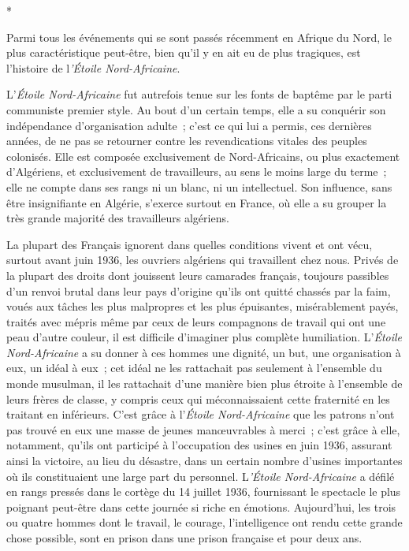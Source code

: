 \documentclass[french,twoside]{book} %
\begin{document}
\begin{center}
*\end{center}
\noindent Parmi tous les événements qui se sont passés récemment en Afrique du Nord, le plus caractéristique peut-être, bien qu'il y en ait eu de plus tragiques, est l'histoire de l{\itshape 'Étoile Nord-Africaine}.\par
L'{\itshape Étoile Nord-Africaine} fut autrefois tenue sur les fonts de baptême par le parti communiste premier style. Au bout d'un certain temps, elle a su conquérir son indépendance d'organisation adulte ; c'est ce qui lui a permis, ces dernières années, de ne pas se retourner contre les revendications vitales des peuples colonisés. Elle est composée exclusivement de Nord-Africains, ou plus exactement d'Algériens, et exclusivement de travailleurs, au sens le moins large du terme ; elle ne compte dans ses rangs ni un blanc, ni un intellectuel. Son influence, sans être insignifiante en Algérie, s'exerce surtout en France, où elle a su grouper la très grande majorité des travailleurs algériens.\par
La plupart des Français ignorent dans quelles conditions vivent et ont vécu, surtout avant juin 1936, les ouvriers algériens qui travaillent chez nous. Privés de la plupart des droits dont jouissent leurs camarades français, tou­jours passibles d'un renvoi brutal dans leur pays d'origine qu'ils ont quitté chassés par la faim, voués aux tâches les plus malpropres et les plus épuisantes, misérablement payés, traités avec mépris même par ceux de leurs compagnons de travail qui ont une peau d'autre couleur, il est difficile d'imaginer plus complète humiliation. L'{\itshape Étoile Nord-Africaine} a su donner à ces hommes une dignité, un but, une organisation à eux, un idéal à eux ; cet idéal ne les rattachait pas seulement à l'ensemble du monde musulman, il les rattachait d'une manière bien plus étroite à l'ensemble de leurs frères de classe, y compris ceux qui méconnaissaient cette fraternité en les traitant en inférieurs. C'est grâce à l'{\itshape Étoile Nord-Africaine} que les patrons n'ont pas trouvé en eux une masse de jeunes manœuvrables à merci ; c'est grâce à elle, notamment, qu'ils ont participé à l'occupation des usines en juin 1936, assurant ainsi la victoire, au lieu du désastre, dans un certain nombre d'usines importantes où ils constituaient une large part du personnel. L{\itshape 'Étoile Nord-Africaine} a défilé en rangs pressés dans le cortège du 14 juillet 1936, fournissant le spectacle le plus poignant peut-être dans cette journée si riche en émotions. Aujourd'hui, les trois ou quatre hommes dont le travail, le courage, l'intelligence ont rendu cette grande chose possible, sont en prison dans une prison française et pour deux ans.\par
\end{document}
